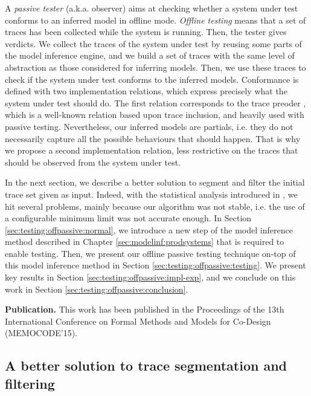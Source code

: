 A \textit{passive tester} (a.k.a. observer) aims at checking
whether a system under test conforms to an inferred model in
offline mode. \textit{Offline testing} means that a set of
traces has been collected while the system is running. Then, the
tester gives verdicts.
We collect the traces of the system under test by reusing some
parts of the model inference engine, and we build a set of traces
with the same level of abstraction as those considered for
inferring models. Then, we use these traces to check if the
system under test conforms to the inferred models.  Conformance
is defined with two implementation relations, which express
precisely what the system under test should do. The first
relation corresponds to the trace preoder \cite{DNH84}, which is
a well-known relation based upon trace inclusion, and heavily
used with passive testing.  Nevertheless, our inferred models are
partials, i.e.  they do not necessarily capture all the possible
behaviours that should happen. That is why we propose a second
implementation relation, less restrictive on the traces that
should be observed from the system under test.

In the next section, we describe a better solution to segment and
filter the initial trace set given as input. Indeed, with the
statistical analysis introduced in
,
we hit several problems, mainly because our algorithm was not
stable, i.e. the use of a configurable minimum limit was not
accurate enough. In Section \ref{sec:testing:offpassive:normal},
we introduce a new step of the model inference method described
in Chapter \ref{sec:modelinf:prodsystems} that is required to
enable testing. Then, we present our offline passive testing
technique on-top of this model inference method in Section
\ref{sec:testing:offpassive:testing}. We present key results in
Section \ref{sec:testing:offpassive:impl-exp}, and we conclude on
this work in Section \ref{sec:testing:offpassive:conclusion}.

\textbf{Publication.} This work has been published in the
Proceedings of the 13th International Conference on Formal
Methods and Models for Co-Design (MEMOCODE'15).


\subsection{A better solution to trace segmentation and filtering}


